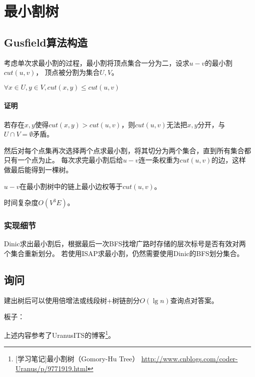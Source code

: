 \section{最小割树}
\subsection{Gusfield算法构造}

考虑单次求最小割的过程，最小割将顶点集合一分为二，设求$u-v$的最小割$cut(u,v)$，
顶点被分割为集合$U,V$。
\begin{lemma}
	$\forall x\in U,y\in V,cut(x,y)\leq cut(u,v)$
\end{lemma}
\paragraph{证明}
若存在$x,y$使得$cut(x,y)>cut(u,v)$，则$cut(u,v)$无法把$x,y$分开，与
$U\cap V=\emptyset$矛盾。

然后对每个点集再次选择两个点求最小割，将其切分为两个集合，直到所有集合都只有一个点为止。
每次求完最小割后给$u-v$连一条权重为$cut(u,v)$的边，这样做最后能得到一棵树。
\begin{theorem}
	$u-v$在最小割树中的链上最小边权等于$cut(u,v)$。
\end{theorem}
时间复杂度$O(V^3E)$。
\subsubsection{实现细节}
Dinic求出最小割后，根据最后一次BFS找增广路时存储的层次标号是否有效对两个集合重新划分。
若使用ISAP求最小割，仍然需要使用Dinic的BFS划分集合。
\subsection{询问}
建出树后可以使用倍增法或线段树+树链剖分$O(\lg n)$查询点对答案。

板子：

上述内容参考了UranusITS的博客\footnote{
	[学习笔记]最小割树（Gomory-Hu Tree）
	\url{http://www.cnblogs.com/coder-Uranus/p/9771919.html}
}。
